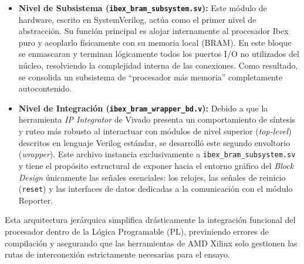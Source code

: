 \begin{itemize}
    \item \textbf{Nivel de Subsistema (\texttt{ibex\_bram\_subsystem.sv}):} Este módulo de hardware, escrito en SystemVerilog, actúa como el primer nivel de abstracción. Su función principal es alojar internamente al procesador Ibex puro y acoplarlo físicamente con su memoria local (BRAM). En este bloque se enmascaran y terminan lógicamente todos los puertos I/O no utilizados del núcleo, resolviendo la complejidad interna de las conexiones. Como resultado, se consolida un subsistema de ``procesador más memoria'' completamente autocontenido.
    
    \item \textbf{Nivel de Integración (\texttt{ibex\_bram\_wrapper\_bd.v}):} Debido a que la herramienta \textit{IP Integrator} de Vivado presenta un comportamiento de síntesis y ruteo más robusto al interactuar con módulos de nivel superior (\textit{top-level}) descritos en lenguaje Verilog estándar, se desarrolló este segundo envoltorio (\textit{wrapper}). Este archivo instancia exclusivamente a \texttt{ibex\_bram\_subsystem.sv} y tiene el propósito estructural de exponer hacia el entorno gráfico del \textit{Block Design} únicamente las señales esenciales: los relojes, las señales de reinicio (\texttt{reset}) y las interfaces de datos dedicadas a la comunicación con el módulo Reporter.
\end{itemize}

Esta arquitectura jerárquica simplifica drásticamente la integración funcional del procesador dentro de la Lógica Programable (PL), previniendo errores de compilación y asegurando que las herramientas de AMD Xilinx solo gestionen las rutas de interconexión estrictamente necesarias para el ensayo.

